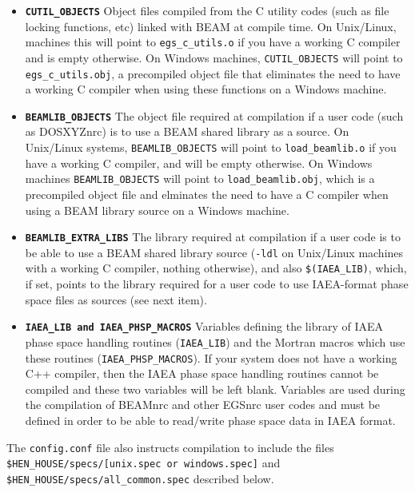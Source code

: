\documentclass[12pt,twoside]{article}
\begin{document}
\begin{description}
\begin{itemize}
\item {\bf \tt CUTIL\_OBJECTS} Object files compiled from the C utility
codes (such as file locking functions, etc) linked with BEAM at compile
time.  On Unix/Linux, machines this will point to {\tt egs\_c\_utils.o}
if you have a working C compiler and is empty otherwise.  On Windows machines,
{\tt CUTIL\_OBJECTS} will point to {\tt egs\_c\_utils.obj}, a precompiled
object file that eliminates the need to have a working C compiler when
using these functions on a Windows machine.
\item {\bf \tt BEAMLIB\_OBJECTS} The object
file required at compilation if a user code (such as DOSXYZnrc) is to
use a BEAM shared library as a source.  On Unix/Linux systems,
{\tt BEAMLIB\_OBJECTS} will
point to {\tt load\_beamlib.o} if you have a working C compiler, and will be
empty otherwise.  On Windows machines {\tt BEAMLIB\_OBJECTS} will
point to {\tt load\_beamlib.obj}, which is a precompiled object file and
elminates the need to have a C compiler when using a BEAM library source
on a Windows machine.
\item {\bf \tt BEAMLIB\_EXTRA\_LIBS} The library required at compilation
if a user code is to be able to use a BEAM shared library source
({\tt -ldl} on Unix/Linux machines with a working C compiler,
nothing otherwise), and also {\tt \$(IAEA\_LIB)}, which, if set, points
to the library required for a user code to use IAEA-format phase space
files as sources (see next item).
\item {\bf \tt IAEA\_LIB and IAEA\_PHSP\_MACROS}
Variables defining the library of IAEA phase space handling routines
({\tt IAEA\_LIB}) and the Mortran macros which use these routines
({\tt IAEA\_PHSP\_MACROS}). If your system does not have a working
C++ compiler, then the IAEA phase space handling routines cannot be compiled
and these two variables will be left blank.  Variables are used during the
compilation of BEAMnrc and other EGSnrc user codes and must be defined in
order to be able to read/write phase space data in IAEA format.
\end{itemize}
The {\tt config.conf} file also instructs compilation to include the files\\
{\tt \$HEN\_HOUSE/specs/[unix.spec or windows.spec]} and\\
{\tt \$HEN\_HOUSE/specs/all\_common.spec} described below.

\end{description}
\end{document}

